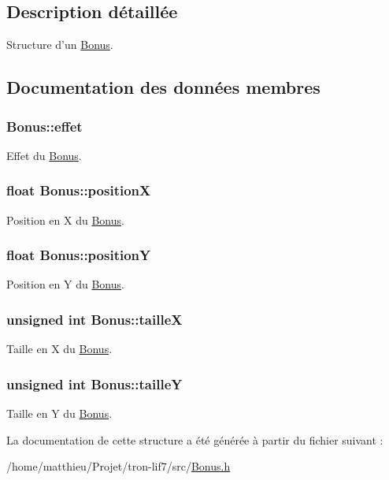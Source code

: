 \subsection{Description détaillée}
Structure d'un \hyperlink{structBonus}{Bonus}. 

\subsection{Documentation des données membres}
\hypertarget{structBonus_a0619fdbeba9edd702a607887a7f79f62}{
\subsubsection[{effet}]{ Bonus\-::effet}}\label{structBonus_a0619fdbeba9edd702a607887a7f79f62}
Effet du \hyperlink{structBonus}{Bonus}. \hypertarget{structBonus_a299226996e549498df83b3768d3b43af}{
\subsubsection[{position\-X}]{\setlength{\rightskip}{0pt plus 5cm}float Bonus\-::position\-X}}\label{structBonus_a299226996e549498df83b3768d3b43af}
Position en X du \hyperlink{structBonus}{Bonus}. \hypertarget{structBonus_aa5cc7fbc0c3fe6b014900c7223a1d6cb}{
\subsubsection[{position\-Y}]{\setlength{\rightskip}{0pt plus 5cm}float Bonus\-::position\-Y}}\label{structBonus_aa5cc7fbc0c3fe6b014900c7223a1d6cb}
Position en Y du \hyperlink{structBonus}{Bonus}. \hypertarget{structBonus_aede925340da983fdddf1f901c976e00a}{
\subsubsection[{taille\-X}]{\setlength{\rightskip}{0pt plus 5cm}unsigned int Bonus\-::taille\-X}}\label{structBonus_aede925340da983fdddf1f901c976e00a}
Taille en X du \hyperlink{structBonus}{Bonus}. \hypertarget{structBonus_ae570700aa309f6de2f91fc84ddb409c2}{
\subsubsection[{taille\-Y}]{\setlength{\rightskip}{0pt plus 5cm}unsigned int Bonus\-::taille\-Y}}\label{structBonus_ae570700aa309f6de2f91fc84ddb409c2}
Taille en Y du \hyperlink{structBonus}{Bonus}. 

La documentation de cette structure a été générée à partir du fichier suivant \-:\begin{DoxyCompactItemize}
\item 
/home/matthieu/\-Projet/tron-\/lif7/src/\hyperlink{Bonus_8h}{Bonus.\-h}\end{DoxyCompactItemize}
